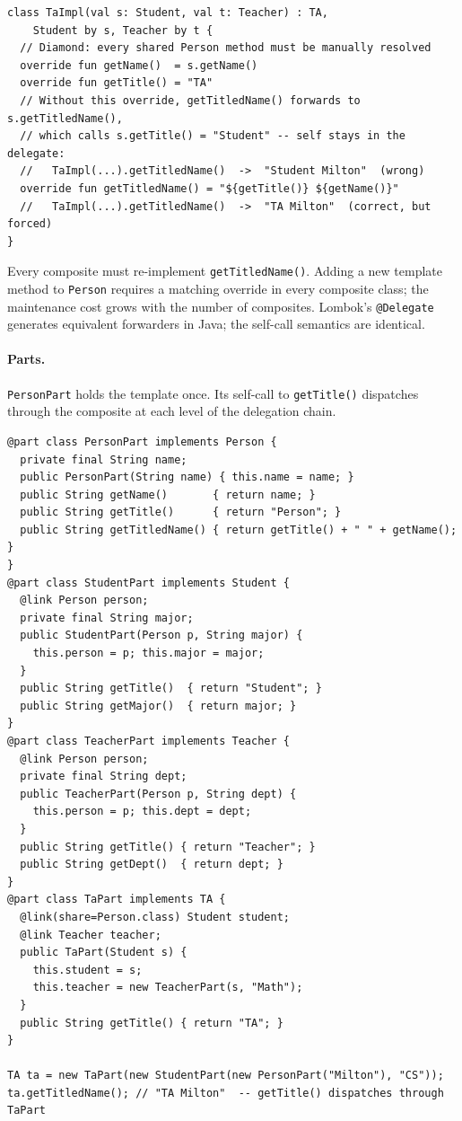 \documentclass[acmsmall,nonacm]{acmart}
\theoremstyle{acmplain}
\theoremstyle{acmdefinition}
\newcommand{\code}[1]{\texttt{#1}}
\begin{document}
\begin{lstlisting}[style=kotlin]
class TaImpl(val s: Student, val t: Teacher) : TA,
    Student by s, Teacher by t {
  // Diamond: every shared Person method must be manually resolved
  override fun getName()  = s.getName()
  override fun getTitle() = "TA"
  // Without this override, getTitledName() forwards to s.getTitledName(),
  // which calls s.getTitle() = "Student" -- self stays in the delegate:
  //   TaImpl(...).getTitledName()  ->  "Student Milton"  (wrong)
  override fun getTitledName() = "${getTitle()} ${getName()}"
  //   TaImpl(...).getTitledName()  ->  "TA Milton"  (correct, but forced)
}
\end{lstlisting}

Every composite must re-implement \code{getTitledName()}.
Adding a new template method to \code{Person} requires a matching override in
every composite class; the maintenance cost grows with the number of composites. Lombok's
\code{@Delegate} generates equivalent forwarders in Java; the self-call
semantics are identical.

\paragraph{Parts.}
\code{PersonPart} holds the template once. Its self-call to \code{getTitle()}
dispatches through the composite at each level of the delegation chain.

\begin{lstlisting}
@part class PersonPart implements Person {
  private final String name;
  public PersonPart(String name) { this.name = name; }
  public String getName()       { return name; }
  public String getTitle()      { return "Person"; }
  public String getTitledName() { return getTitle() + " " + getName(); }
}
@part class StudentPart implements Student {
  @link Person person;
  private final String major;
  public StudentPart(Person p, String major) {
    this.person = p; this.major = major;
  }
  public String getTitle()  { return "Student"; }
  public String getMajor()  { return major; }
}
@part class TeacherPart implements Teacher {
  @link Person person;
  private final String dept;
  public TeacherPart(Person p, String dept) {
    this.person = p; this.dept = dept;
  }
  public String getTitle() { return "Teacher"; }
  public String getDept()  { return dept; }
}
@part class TaPart implements TA {
  @link(share=Person.class) Student student;
  @link Teacher teacher;
  public TaPart(Student s) {
    this.student = s;
    this.teacher = new TeacherPart(s, "Math");
  }
  public String getTitle() { return "TA"; }
}

TA ta = new TaPart(new StudentPart(new PersonPart("Milton"), "CS"));
ta.getTitledName(); // "TA Milton"  -- getTitle() dispatches through TaPart
\end{lstlisting}
\end{document}

